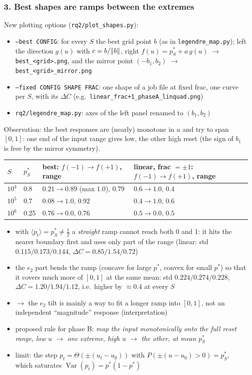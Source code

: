 \begin{sloppypar}
\subsubsection*{3. Best shapes are ramps between the extremes}
New plotting options (\texttt{rq2/plot\_shapes.py}):
\begin{itemize}
    \item \texttt{--best CONFIG}: for every $S$ the best grid point $b$ (as in \texttt{legendre\_map.py}); left the
    direction $g(u)$ with $c = b / \norm{b}$, right $f(u) = p^*_S + a\, g(u)$ $\to$
    \texttt{best\_<grid>.png}, and the mirror point $(-b_1, b_2)$ $\to$ \texttt{best\_<grid>\_mirror.png}
    \item \texttt{--fixed CONFIG SHAPE FRAC}: one shape of a job file at fixed frac, one curve per $S$, with its
    $\Delta C$ (e.g.\ \texttt{linear\_frac+1\_phaseA\_linquad.png})
    \item \texttt{rq2/legendre\_map.py}: axes of the left panel renamed to $(b_1, b_2)$
\end{itemize}
Observation: the best responses are (nearly) monotone in $u$ and try to span $[0, 1]$: one end of the input range
gives low, the other high reset (the sign of $b_1$ is free by the mirror symmetry).
\begin{center}
\begin{tabular}{llll}
    \hline
    $S$ & $p^*_S$ & best: $f(-1) \to f(+1)$, range & linear, frac $= \pm 1$: $f(-1) \to f(+1)$, range \\
    \hline
    $10^4$ & 0.8 & $0.21 \to 0.89$ (max $1.0$), $0.79$ & $0.6 \to 1.0$, $0.4$ \\
    $10^5$ & 0.7 & $0.08 \to 1.0$, $0.92$ & $0.4 \to 1.0$, $0.6$ \\
    $10^6$ & 0.25 & $0.76 \to 0.0$, $0.76$ & $0.5 \to 0.0$, $0.5$ \\
    \hline
\end{tabular}
\end{center}
\begin{itemize}
    \item with $\langle p_t \rangle = p^*_S \neq \tfrac{1}{2}$ a \emph{straight} ramp cannot reach both 0 and 1: it
    hits the nearer boundary first and uses only part of the range (linear: std $0.115 / 0.173 / 0.144$,
    $\Delta C = 0.85 / 1.54 / 0.72$)
    \item the $e_2$ part bends the ramp (concave for large $p^*$, convex for small $p^*$) so that it covers much more
    of $[0, 1]$ at the same mean: std $0.224 / 0.274 / 0.228$, $\Delta C = 1.20 / 1.94 / 1.12$, i.e.\ higher by
    $\approx 0.4$ at every $S$
    \item $\to$ the $e_2$ tilt is mainly a way to fit a longer ramp into $[0, 1]$, not an independent ``magnitude''
    response (interpretation)
    \item proposed rule for phase B: \emph{map the input monotonically onto the full reset range, low $u$ $\to$ one
    extreme, high $u$ $\to$ the other, at mean $p^*_S$}
    \item limit: the step $p_t = \Theta(\pm(u_t - u_0))$ with $P(\pm(u - u_0) > 0) = p^*_S$, which saturates
    $\operatorname{Var}(p_t) = p^*(1 - p^*)$
\end{itemize}


\end{sloppypar}
